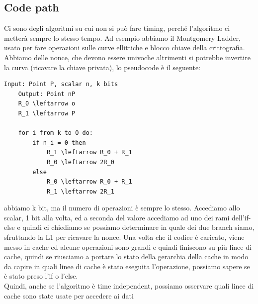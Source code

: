 \documentclass[12pt, oneside]{extbook} %
\begin{document}
\subsection{Code path}
Ci sono degli algoritmi su cui non si può fare timing, perché l'algoritmo ci metterà sempre lo stesso tempo. Ad esempio abbiamo il Montgomery Ladder, usato per fare operazioni sulle curve ellittiche e blocco chiave della crittografia. Abbiamo delle nonce, che devono essere univoche altrimenti si potrebbe invertire la curva (ricavare la chiave privata), lo pseudocode è il seguente:
\begin{lstlisting}[mathescape]
	Input: Point P, scalar n, k bits
	Output: Point nP
	R_0 \leftarrow o
	R_1 \leftarrow P
	
	for i from k to O do:
		if n_i = 0 then
			R_1 \leftarrow R_0 + R_1
			R_0 \leftarrow 2R_0
		else
			R_0 \leftarrow R_0 + R_1
			R_1 \leftarrow 2R_1
\end{lstlisting}
abbiamo k bit, ma il numero di operazioni è sempre lo stesso. Accediamo allo scalar, 1 bit alla volta, ed a seconda del valore accediamo ad uno dei rami dell'if-else e quindi ci chiediamo se possiamo determinare in quale dei due branch siamo, sfruttando la L1 per ricavare la nonce. Una volta che il codice è caricato, viene messo in cache ed alcune operazioni sono grandi e quindi finiscono su più linee di cache, quindi se riusciamo a portare lo stato della gerarchia della cache in modo da capire in quali linee di cache è stato eseguita l'operazione, possiamo sapere se è stato preso l'if o l'else.\\ Quindi, anche se l'algoritmo è time independent, possiamo osservare quali linee di cache sono state usate per accedere ai dati
\end{document}
